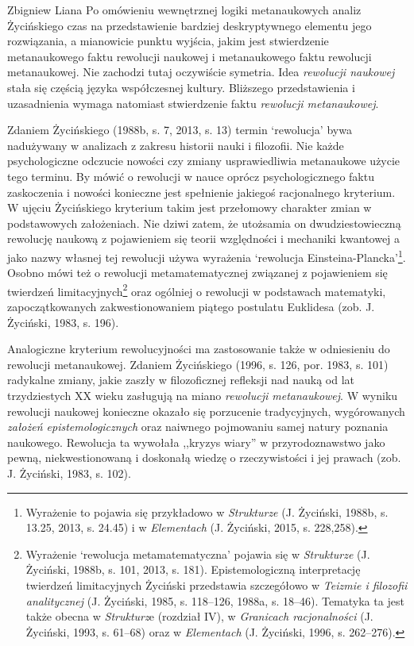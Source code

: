\begin{artplenv}{Zbigniew Liana}
Po omówieniu wewnętrznej logiki metanaukowych analiz Życińskiego czas na przedstawienie bardziej deskryptywnego elementu
jego rozwiązania, a mianowicie punktu wyjścia, jakim jest stwierdzenie metanaukowego faktu rewolucji naukowej i
metanaukowego faktu rewolucji metanaukowej. Nie zachodzi tutaj oczywiście symetria. Idea \textit{rewolucji naukowej}
stała się częścią języka współczesnej kultury. Bliższego przedstawienia i uzasadnienia wymaga natomiast stwierdzenie
faktu \textit{rewolucji metanaukowej}. 

Zdaniem Życińskiego \label{ref:RNDm1e4fQpTDw}(1988b, s. 7, 2013, s. 13) termin ‘rewolucja’ bywa nadużywany w analizach z
zakresu historii nauki i filozofii. Nie każde psychologiczne odczucie nowości czy zmiany usprawiedliwia metanaukowe
użycie tego terminu. By mówić o rewolucji w nauce oprócz psychologicznego faktu zaskoczenia i nowości konieczne jest
spełnienie jakiegoś racjonalnego kryterium. W ujęciu Życińskiego kryterium takim jest przełomowy charakter zmian w
podstawowych założeniach. Nie dziwi zatem, że utożsamia on dwudziestowieczną rewolucję naukową z pojawieniem się teorii
względności i mechaniki kwantowej a jako nazwy własnej tej rewolucji używa wyrażenia ‘rewolucja
Einsteina-Plancka’\footnote{Wyrażenie to pojawia się przykładowo w \textit{Strukturze} \label{ref:RNDnNQlvKNfJU}(J.
	Życiński, 1988b, s. 13.25, 2013, s. 24.45) i w \textit{Elementach} \label{ref:RNDwUSTjxSagp}(J. Życiński, 2015, s.
	228,258).}. Osobno mówi też o rewolucji metamatematycznej związanej z pojawieniem się twierdzeń
limitacyjnych\footnote{Wyrażenie ‘rewolucja metamatematyczna’ pojawia się w \textit{Strukturze }
	\label{ref:RND06p9KBsVwr}(J. Życiński, 1988b, s. 101, 2013, s. 181). Epistemologiczną interpretację twierdzeń
	limitacyjnych Życiński przedstawia szczegółowo w \textit{Teizmie i filozofii analitycznej} \label{ref:RNDromKVdEplH}(J.
	Życiński, 1985, s. 118–126, 1988a, s. 18–46). Tematyka ta jest także obecna w \textit{Strukturz}e (rozdział IV), w
	\textit{Granicach racjonalności} \label{ref:RNDVhjIsTMBSi}(J. Życiński, 1993, s. 61–68) oraz w \textit{Elementach}
	\label{ref:RNDoBnYdXZe0T}(J. Życiński, 1996, s. 262–276).} oraz ogólniej o rewolucji w podstawach matematyki,
zapoczątkowanych zakwestionowaniem piątego postulatu Euklidesa \label{ref:RNDjSFh4bpxsh}(zob. J. Życiński, 1983, s.
196).

Analogiczne kryterium rewolucyjności ma zastosowanie także w odniesieniu do rewolucji metanaukowej. Zdaniem Życińskiego
\label{ref:RND9iw6GUDcsc}(1996, s. 126, por. 1983, s. 101) radykalne zmiany, jakie zaszły w filozoficznej refleksji nad
nauką od lat trzydziestych XX wieku zasługują na miano \textit{rewolucji metanaukowej}. W wyniku rewolucji naukowej
konieczne okazało się porzucenie tradycyjnych, wygórowanych \textit{założeń epistemologicznych} oraz naiwnego pojmowaniu
samej natury poznania naukowego. Rewolucja ta wywołała ,,kryzys wiary'' w przyrodoznawstwo jako pewną, niekwestionowaną i
doskonałą wiedzę o rzeczywistości i jej prawach \label{ref:RNDbGHN8nMTuu}(zob. J. Życiński, 1983, s. 102).


\end{artplenv}
